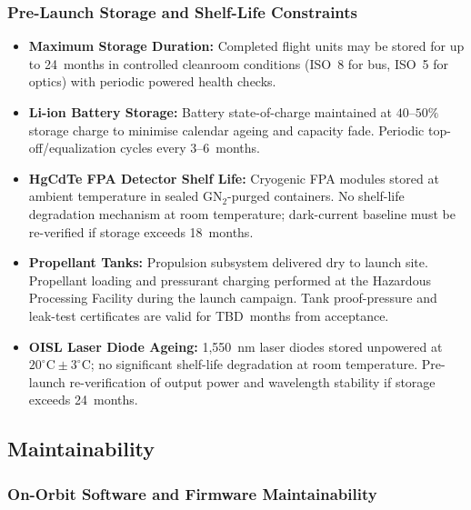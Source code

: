 \subsubsection{Pre-Launch Storage and Shelf-Life Constraints}

\begin{itemize}
    \item \textbf{Maximum Storage Duration:} Completed flight units may be stored for up to 24~months in controlled cleanroom conditions (ISO~8 for bus, ISO~5 for optics) with periodic powered health checks.
    \item \textbf{Li-ion Battery Storage:} Battery state-of-charge maintained at $40$--$50\%$ storage charge to minimise calendar ageing and capacity fade. Periodic top-off/equalization cycles every 3--6~months.
    \item \textbf{HgCdTe FPA Detector Shelf Life:} Cryogenic FPA modules stored at ambient temperature in sealed $\mathrm{GN_2}$-purged containers. No shelf-life degradation mechanism at room temperature; dark-current baseline must be re-verified if storage exceeds 18~months.
    \item \textbf{Propellant Tanks:} Propulsion subsystem delivered dry to launch site. Propellant loading and pressurant charging performed at the Hazardous Processing Facility during the launch campaign. Tank proof-pressure and leak-test certificates are valid for TBD~months from acceptance.
    \item \textbf{OISL Laser Diode Ageing:} 1,550~nm laser diodes stored unpowered at $20^\circ\mathrm{C} \pm 3^\circ\mathrm{C}$; no significant shelf-life degradation at room temperature. Pre-launch re-verification of output power and wavelength stability if storage exceeds 24~months.
\end{itemize}

\subsection{Maintainability}
\label{sec:constraints_maintainability}

\subsubsection{On-Orbit Software and Firmware Maintainability}

